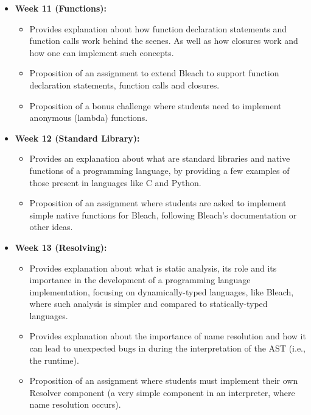 \begin{itemize}
    \item \textbf{Week 11 (Functions):}
        \begin{itemize}
            \item Provides explanation about how function declaration statements and function calls work behind the scenes. As well as how closures work and how one can implement such concepts.
            \item Proposition of an assignment to extend Bleach to support function declaration statements, function calls and closures.
            \item Proposition of a bonus challenge where students need to implement anonymous (lambda) functions.
        \end{itemize}

    \item \textbf{Week 12 (Standard Library):}
        \begin{itemize}
            \item Provides an explanation about what are standard libraries and native functions of a programming language, by providing a few examples of those present in languages like C and Python.
            \item Proposition of an assignment where students are asked to implement simple native functions for Bleach, following Bleach's documentation or other ideas.
        \end{itemize}
    
    \item \textbf{Week 13 (Resolving):}
        \begin{itemize}
            \item Provides explanation about what is static analysis, its role and its importance in the development of a programming language implementation, focusing on dynamically-typed languages, like Bleach, where such analysis is simpler and compared to statically-typed languages.
            \item Provides explanation about the importance of name resolution and how it can lead to unexpected bugs in during the interpretation of the AST (i.e., the runtime).
            \item Proposition of an assignment where students must implement their own Resolver component (a very simple component in an interpreter, where name resolution occurs).
        \end{itemize}
    

\end{itemize}
